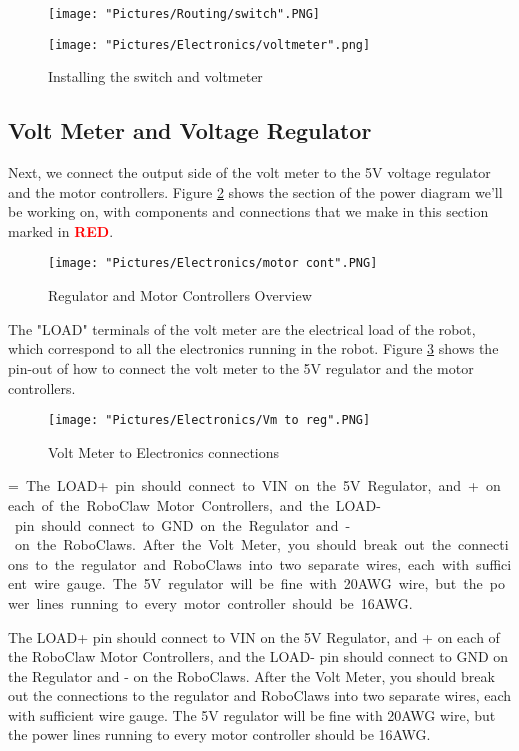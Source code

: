 \documentclass[12pt]{article}
\makeatletter
\newcommand{\mybox}[1]{%
  \setbox0=\hbox{#1}%
  \setlength{\@tempdima}{\dimexpr\wd0+13pt}%
  \begin{tcolorbox}[colframe=mycolor,boxrule=0.5pt,arc=4pt,
      left=6pt,right=6pt,top=6pt,bottom=6pt,boxsep=0pt,width=0.95\textwidth]
    #1
  \end{tcolorbox}
}
\makeatother
\begin{document}
\begin{figure}[H]
 	\centering
  	\begin{minipage}[b]{0.40\textwidth}
		\texttt{[image: "Pictures/Routing/switch".PNG]}
  	\end{minipage}
  	\hfill
  	\begin{minipage}[b]{0.50\textwidth}
    		\texttt{[image: "Pictures/Electronics/voltmeter".png]}
  	\end{minipage}
	\caption{Installing the switch and voltmeter}
	\label{vms}
\end{figure}



\subsection{Volt Meter and Voltage Regulator}
Next, we connect the output side of the volt meter to the 5V voltage regulator and the motor controllers. Figure \ref{motor cont} shows the section of the power diagram we'll be working on, with components and connections that we make in this section marked in \textcolor{red}{\textbf{RED}}.

\begin{figure}[H]
  	\centering
    	\texttt{[image: "Pictures/Electronics/motor cont".PNG]}
 	\caption{Regulator and Motor Controllers Overview}
	\label{motor cont}
\end{figure}


The "LOAD" terminals of the volt meter are the electrical load of the robot, which correspond to all the electronics running in the robot. Figure \ref{vm sch} shows the pin-out of how to connect the volt meter to the 5V regulator and the motor controllers.

\begin{figure}[H]
  	\centering
    	\texttt{[image: "Pictures/Electronics/Vm to reg".PNG]}
 	\caption{Volt Meter to Electronics connections}
	\label{vm sch}
\end{figure}

\mybox{
\noindent  The LOAD+ pin should connect to VIN on the 5V Regulator, and + on each of the RoboClaw Motor Controllers, and the LOAD- pin should connect to GND on the Regulator and - on the RoboClaws. After the Volt Meter, you should break out the connections to the regulator and RoboClaws into two separate wires, each with sufficient wire gauge. The 5V regulator will be fine with 20AWG wire, but the power lines running to every motor controller should be 16AWG.  
}
\end{document}
